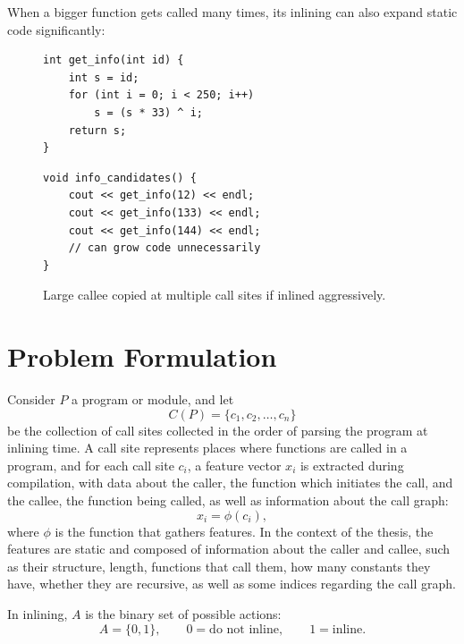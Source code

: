 \documentclass[12pt, a4paper]{report}
\begin{document}
When a bigger function gets called many times, its inlining can also expand
static code significantly:

\begin{figure}[H]
\centering
\begin{minipage}[t]{0.49\textwidth}
\begin{verbatim}
int get_info(int id) {
    int s = id;
    for (int i = 0; i < 250; i++)
        s = (s * 33) ^ i;
    return s;
}
\end{verbatim}
\end{minipage}\hfill
\begin{minipage}[t]{0.47\textwidth}
\begin{verbatim}
void info_candidates() {
    cout << get_info(12) << endl;
    cout << get_info(133) << endl;
    cout << get_info(144) << endl;
    // can grow code unnecessarily
}
\end{verbatim}
\end{minipage}
\caption{Large callee copied at multiple call sites if inlined aggressively.}
\label{fig:get-info-example}
\end{figure}


\chapter{Problem Formulation}

Consider \(P\) a program or module, and let
\[
  C(P) = \{c_1,c_2,\ldots,c_n\}
\]
be the collection of call sites collected in the order of parsing the program
at inlining time. A call site represents places where functions are called in a
program, and for each call site \(c_i\), a feature vector \(x_i\) is extracted
during compilation, with data about the caller, the function which initiates the
call, and the callee, the function being called, as well as information about
the call graph:
\[
  x_i = \phi(c_i),
\]
where \(\phi\) is the function that gathers features. In the context of the
thesis, the features are static and composed of information about the caller and
callee, such as their structure, length, functions that call them, how many
constants they have, whether they are recursive, as well as some indices
regarding the call graph.

In inlining, \(A\) is the binary set of possible actions:
\[
  A = \{0,1\}, \qquad 0 = \text{do not inline}, \qquad 1 = \text{inline}.
\]
\end{document}
